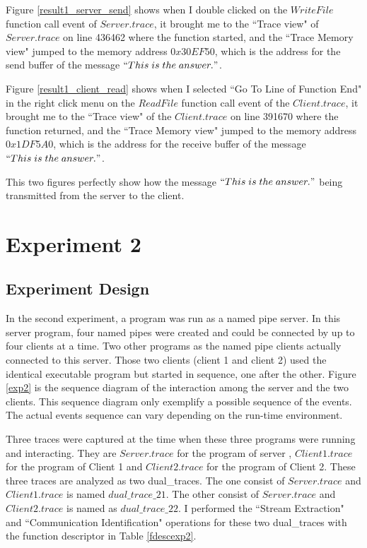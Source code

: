 Figure \ref{result1_server_send} shows when I double clicked on the $WriteFile$ function call event of $Server.trace$, it brought me to the ``Trace view" of $Server.trace$ on line 436462 where the function started, and the ``Trace Memory view" jumped to the memory address $0x30EF50$, which is the address for the send buffer of the message $``This\; is\; the\; answer."$.

Figure \ref{result1_client_read} shows when I selected ``Go To Line of Function End" in the right click menu on the $ReadFile$ function call event of the $Client.trace$, it brought me to the ``Trace view" of the $Client.trace$ on line 391670 where the function returned, and the ``Trace Memory view" jumped to the memory address $0x1DF5A0$, which is the address for the receive buffer of the message $``This\; is\; the\; answer."$.

This two figures perfectly show how the message $``This\; is\; the\; answer."$ being transmitted from the server to the client.

\section{Experiment 2}
\subsection{Experiment Design}
In the second experiment, a program was run as a named pipe server. In this server program, four named pipes were created and could be connected by up to four clients at a time. Two other programs as the named pipe clients actually connected to this server. Those two clients (client 1 and client 2) used the identical executable program but started in sequence, one after the other. Figure \ref{exp2} is the sequence diagram of the interaction among the server and the two clients. This sequence diagram only exemplify a possible sequence of the events. The actual events sequence can vary depending on the run-time environment. 

Three traces were captured at the time when these three programs were running and interacting. They are $Server.trace$ for the program of server , $Client1.trace$ for the program of Client 1 and $Client2.trace$ for the program of Client 2. These three traces are analyzed as two dual\_traces. The one consist of $Server.trace$ and $Client1.trace$ is named $dual\_trace\_21$. The other consist of $Server.trace$ and $Client2.trace$ is named as $dual\_trace\_22$. I performed the ``Stream Extraction" and ``Communication Identification" operations for these two dual\_traces with the function descriptor in Table \ref{fdescexp2}.


